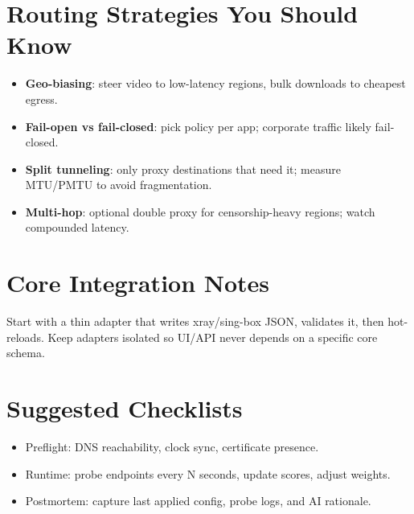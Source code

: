 \section{Routing Strategies You Should Know}
\begin{itemize}
    \item \textbf{Geo-biasing}: steer video to low-latency regions, bulk downloads to cheapest egress.
    \item \textbf{Fail-open vs fail-closed}: pick policy per app; corporate traffic likely fail-closed.
    \item \textbf{Split tunneling}: only proxy destinations that need it; measure MTU/PMTU to avoid fragmentation.
    \item \textbf{Multi-hop}: optional double proxy for censorship-heavy regions; watch compounded latency.
\end{itemize}

\section{Core Integration Notes}
Start with a thin adapter that writes xray/sing-box JSON, validates it, then hot-reloads. Keep adapters isolated so UI/API never depends on a specific core schema.

\section{Suggested Checklists}
\begin{itemize}
    \item Preflight: DNS reachability, clock sync, certificate presence.
    \item Runtime: probe endpoints every N seconds, update scores, adjust weights.
    \item Postmortem: capture last applied config, probe logs, and AI rationale.
\end{itemize}

